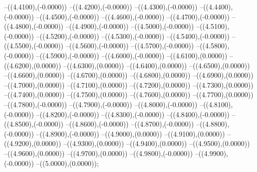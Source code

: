 {	--({\sx*(4.4100)},{\sy*(-0.0000)})
	--({\sx*(4.4200)},{\sy*(-0.0000)})
	--({\sx*(4.4300)},{\sy*(-0.0000)})
	--({\sx*(4.4400)},{\sy*(-0.0000)})
	--({\sx*(4.4500)},{\sy*(-0.0000)})
	--({\sx*(4.4600)},{\sy*(-0.0000)})
	--({\sx*(4.4700)},{\sy*(-0.0000)})
	--({\sx*(4.4800)},{\sy*(-0.0000)})
	--({\sx*(4.4900)},{\sy*(-0.0000)})
	--({\sx*(4.5000)},{\sy*(-0.0000)})
	--({\sx*(4.5100)},{\sy*(-0.0000)})
	--({\sx*(4.5200)},{\sy*(-0.0000)})
	--({\sx*(4.5300)},{\sy*(-0.0000)})
	--({\sx*(4.5400)},{\sy*(-0.0000)})
	--({\sx*(4.5500)},{\sy*(-0.0000)})
	--({\sx*(4.5600)},{\sy*(-0.0000)})
	--({\sx*(4.5700)},{\sy*(-0.0000)})
	--({\sx*(4.5800)},{\sy*(-0.0000)})
	--({\sx*(4.5900)},{\sy*(-0.0000)})
	--({\sx*(4.6000)},{\sy*(-0.0000)})
	--({\sx*(4.6100)},{\sy*(0.0000)})
	--({\sx*(4.6200)},{\sy*(0.0000)})
	--({\sx*(4.6300)},{\sy*(0.0000)})
	--({\sx*(4.6400)},{\sy*(0.0000)})
	--({\sx*(4.6500)},{\sy*(0.0000)})
	--({\sx*(4.6600)},{\sy*(0.0000)})
	--({\sx*(4.6700)},{\sy*(0.0000)})
	--({\sx*(4.6800)},{\sy*(0.0000)})
	--({\sx*(4.6900)},{\sy*(0.0000)})
	--({\sx*(4.7000)},{\sy*(0.0000)})
	--({\sx*(4.7100)},{\sy*(0.0000)})
	--({\sx*(4.7200)},{\sy*(0.0000)})
	--({\sx*(4.7300)},{\sy*(0.0000)})
	--({\sx*(4.7400)},{\sy*(0.0000)})
	--({\sx*(4.7500)},{\sy*(0.0000)})
	--({\sx*(4.7600)},{\sy*(0.0000)})
	--({\sx*(4.7700)},{\sy*(0.0000)})
	--({\sx*(4.7800)},{\sy*(-0.0000)})
	--({\sx*(4.7900)},{\sy*(-0.0000)})
	--({\sx*(4.8000)},{\sy*(-0.0000)})
	--({\sx*(4.8100)},{\sy*(-0.0000)})
	--({\sx*(4.8200)},{\sy*(-0.0000)})
	--({\sx*(4.8300)},{\sy*(-0.0000)})
	--({\sx*(4.8400)},{\sy*(-0.0000)})
	--({\sx*(4.8500)},{\sy*(-0.0000)})
	--({\sx*(4.8600)},{\sy*(-0.0000)})
	--({\sx*(4.8700)},{\sy*(-0.0000)})
	--({\sx*(4.8800)},{\sy*(-0.0000)})
	--({\sx*(4.8900)},{\sy*(-0.0000)})
	--({\sx*(4.9000)},{\sy*(0.0000)})
	--({\sx*(4.9100)},{\sy*(0.0000)})
	--({\sx*(4.9200)},{\sy*(0.0000)})
	--({\sx*(4.9300)},{\sy*(0.0000)})
	--({\sx*(4.9400)},{\sy*(0.0000)})
	--({\sx*(4.9500)},{\sy*(0.0000)})
	--({\sx*(4.9600)},{\sy*(0.0000)})
	--({\sx*(4.9700)},{\sy*(0.0000)})
	--({\sx*(4.9800)},{\sy*(-0.0000)})
	--({\sx*(4.9900)},{\sy*(-0.0000)})
	--({\sx*(5.0000)},{\sy*(0.0000)});
}
